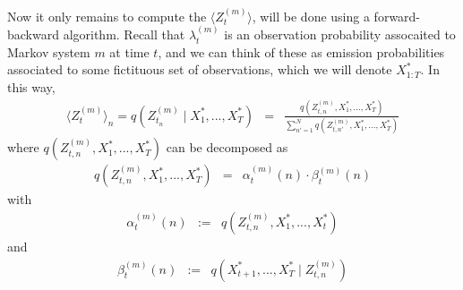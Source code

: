 \documentclass{amsart}
\begin{document}
Now it only remains to compute the $\langle Z_t^{(m)}\rangle$, will be 
done using a forward-backward algorithm.  Recall that $\lambda_t^{(m)}$ 
is an observation probability assocaited to Markov system $m$ at time 
$t$, and we can think of these as emission probabilities associated to 
some fictituous set of observations, which we will denote 
$X_{1:T}^*$.  In this way,
\begin{eqnarray*}
\langle Z_{t}^{(m)}\rangle_n = q(Z_{t_n}^{(m)}\mid 
X_1^{*},...,X_T^{*})
& = & \frac{q(Z_{t,n}^{(m)},
X_1^{*},...,X_T^{*})}{\sum_{n'=1}^Nq(Z_{t,n'}^{(m)}, 
X_1^{*},...,X_T^{*})}
\end{eqnarray*}
where $q(Z_{t,n}^{(m)},X_1^{*},...,X_T^{*})$ can be decomposed as 
\begin{eqnarray*}
q(Z_{t,n}^{(m)},X_1^{*},...,X_T^{*}) &=& \alpha_t^{(m)}(n)\cdot \beta_t^{(m)}(n)
\end{eqnarray*}
with 
\begin{eqnarray*}
\alpha_t^{(m)}(n) &:=& q(Z_{t,n}^{(m)},
X_1^{*},...,X_t^{*})
\end{eqnarray*}
and 
\begin{eqnarray*}
\beta_t^{(m)}(n) &:=& q(X_{t+1}^{*},...,X_T^{*}\mid Z_{t,n}^{(m)})
\end{eqnarray*}
\end{document}

